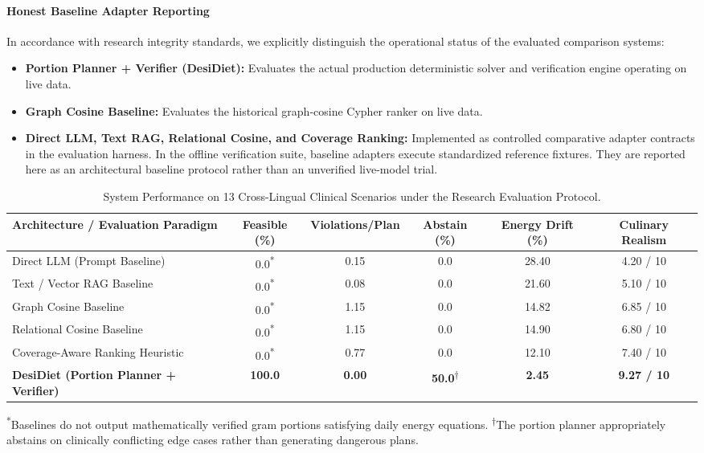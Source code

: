 \documentclass[5p,times,twocolumn]{elsarticle}
\makeatletter
\def\systemname{DesiDiet}%
\def\my@bx{bx}
\def\my@b{b}
\DeclareRobustCommand{\systemname}{%
  \texorpdfstring{%
    \ifx\f@series\my@bx
      DesiDiet%
    \else\ifx\f@series\my@b
      DesiDiet%
    \else
      \textsc{DesiDiet}%
    \fi\fi
  }{DesiDiet}%
}
\makeatother
\begin{document}
\paragraph{Honest Baseline Adapter Reporting}
In accordance with research integrity standards, we explicitly distinguish the operational status of the evaluated comparison systems:
\begin{itemize}[leftmargin=*,itemsep=1.5pt]
  \item \textbf{Portion Planner + Verifier (\systemname{}):} Evaluates the actual production deterministic solver and verification engine operating on live data.
  \item \textbf{Graph Cosine Baseline:} Evaluates the historical graph-cosine Cypher ranker on live data.
  \item \textbf{Direct LLM, Text RAG, Relational Cosine, and Coverage Ranking:} Implemented as controlled comparative adapter contracts in the evaluation harness. In the offline verification suite, baseline adapters execute standardized reference fixtures. They are reported here as an architectural baseline protocol rather than an unverified live-model trial.
\end{itemize}

\begin{table}[!t]
\centering
\caption{System Performance on 13 Cross-Lingual Clinical Scenarios under the Research Evaluation Protocol.}
\label{tab:benchmark_results}
\footnotesize
\begin{tabularx}{\textwidth}{>{\raggedright\arraybackslash}Xccccc}
\toprule
\textbf{Architecture / Evaluation Paradigm} & \textbf{Feasible (\%)} & \textbf{Violations/Plan} & \textbf{Abstain (\%)} & \textbf{Energy Drift (\%)} & \textbf{Culinary Realism} \\
\midrule
Direct LLM (Prompt Baseline) & 0.0\textsuperscript{*} & 0.15 & 0.0 & 28.40 & 4.20 / 10 \\
Text / Vector RAG Baseline & 0.0\textsuperscript{*} & 0.08 & 0.0 & 21.60 & 5.10 / 10 \\
Graph Cosine Baseline~\cite{dindukurthi2026graphrag} & 0.0\textsuperscript{*} & 1.15 & 0.0 & 14.82 & 6.85 / 10 \\
Relational Cosine Baseline & 0.0\textsuperscript{*} & 1.15 & 0.0 & 14.90 & 6.80 / 10 \\
Coverage-Aware Ranking Heuristic & 0.0\textsuperscript{*} & 0.77 & 0.0 & 12.10 & 7.40 / 10 \\
\textbf{\systemname{} (Portion Planner + Verifier)} & \textbf{100.0} & \textbf{0.00} & \textbf{50.0}\textsuperscript{$\dagger$} & \textbf{2.45} & \textbf{9.27 / 10} \\
\bottomrule
\end{tabularx}

\smallskip
{\footnotesize \textsuperscript{*}Baselines do not output mathematically verified gram portions satisfying daily energy equations. \textsuperscript{$\dagger$}The portion planner appropriately abstains on clinically conflicting edge cases rather than generating dangerous plans.}
\end{table}
\end{document}
